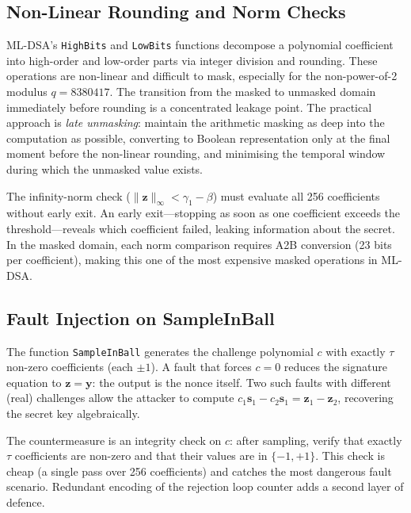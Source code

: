\subsection{Non-Linear Rounding and Norm Checks}
\label{subsec:rounding-norm}

ML-DSA's \texttt{HighBits} and \texttt{LowBits} functions decompose a polynomial coefficient into high-order and low-order parts via integer division and rounding.  These operations are non-linear and difficult to mask, especially for the non-power-of-2 modulus $q = 8380417$.  The transition from the masked to unmasked domain immediately before rounding is a concentrated leakage point.  The practical approach is \emph{late unmasking}: maintain the arithmetic masking as deep into the computation as possible, converting to Boolean representation only at the final moment before the non-linear rounding, and minimising the temporal window during which the unmasked value exists.

The infinity-norm check ($\|\mathbf{z}\|_\infty < \gamma_1 - \beta$) must evaluate all 256 coefficients without early exit.  An early exit---stopping as soon as one coefficient exceeds the threshold---reveals which coefficient failed, leaking information about the secret.  In the masked domain, each norm comparison requires A2B conversion (23 bits per coefficient), making this one of the most expensive masked operations in ML-DSA.


\subsection{Fault Injection on SampleInBall}
\label{subsec:fi-sampleinball}

The function \texttt{SampleInBall} generates the challenge polynomial $c$ with exactly $\tau$ non-zero coefficients (each $\pm 1$).  A fault that forces $c = 0$ reduces the signature equation to $\mathbf{z} = \mathbf{y}$: the output is the nonce itself.  Two such faults with different (real) challenges allow the attacker to compute $c_1 \mathbf{s}_1 - c_2 \mathbf{s}_1 = \mathbf{z}_1 - \mathbf{z}_2$, recovering the secret key algebraically.

The countermeasure is an integrity check on $c$: after sampling, verify that exactly $\tau$ coefficients are non-zero and that their values are in $\{-1, +1\}$.  This check is cheap (a single pass over 256 coefficients) and catches the most dangerous fault scenario.  Redundant encoding of the rejection loop counter adds a second layer of defence.


